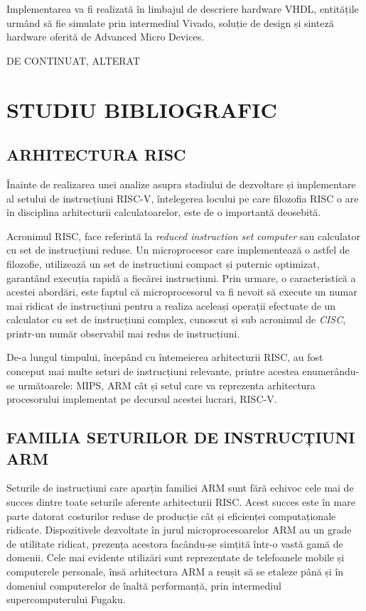 \documentclass[12pt]{article}
\begin{document}
Implementarea va fi realizată în limbajul de descriere hardware VHDL, entitățile urmând să fie simulate prin intermediul Vivado, soluție de design și sinteză hardware oferită de Advanced Micro Devices.

\begin{center}
\vspace*{40mm}
DE CONTINUAT, ALTERAT
\end{center}

\newpage
\section{\centering STUDIU BIBLIOGRAFIC}
\bigbreak
\subsection{ARHITECTURA RISC}
Înainte de realizarea unei analize asupra stadiului de dezvoltare și implementare al setului de instrucțiuni RISC-V, întelegerea locului pe care filozofia RISC o are în disciplina arhitecturii calculatoarelor, este de o importantă deosebită.

Acronimul RISC, face referintă la \textit{reduced instruction set computer} sau calculator cu set de instrucțiuni reduse. Un microprocesor care implementează o astfel de filozofie, utilizează un set de instructiuni compact și puternic optimizat, garantând execuția rapidă a fiecărei instrucțiuni. Prin urmare, o caracteristică a acestei abordări, este faptul că microprocesorul va fi nevoit să execute un numar mai ridicat de instrucțiuni pentru a realiza aceleași operații efectuate de un calculator cu set de instrucțiuni complex, cunoscut și sub acronimul de \textit{CISC}, printr-un număr observabil mai redus de instrucțiuni.

De-a lungul timpului, începând cu întemeierea arhitecturii RISC, au fost conceput mai multe seturi de instrucțiuni relevante, printre acestea enumerându-se următoarele: MIPS, ARM cât și setul care va reprezenta arhitectura procesorului implementat pe decursul acestei lucrari, RISC-V.

\subsection{FAMILIA SETURILOR DE INSTRUCȚIUNI ARM}
Seturile de instrucțiuni care aparțin familiei ARM sunt fără echivoc cele mai de succes dintre toate seturile aferente arhitecturii RISC. Acest succes este în mare parte datorat costurilor reduse de producție cât și eficienței computaționale ridicate. Dispozitivele dezvoltate în jurul microprocesoarelor ARM au un grade de utilitate ridicat, prezența acestora facându-se simțită într-o vastă gamă de domenii. Cele mai evidente utilizări sunt reprezentate de telefoanele mobile și computerele personale, însă arhitectura ARM a reușit să se etaleze până și în domeniul computerelor de înaltă performanță, prin intermediul supercomputerului Fugaku.
\end{document}
